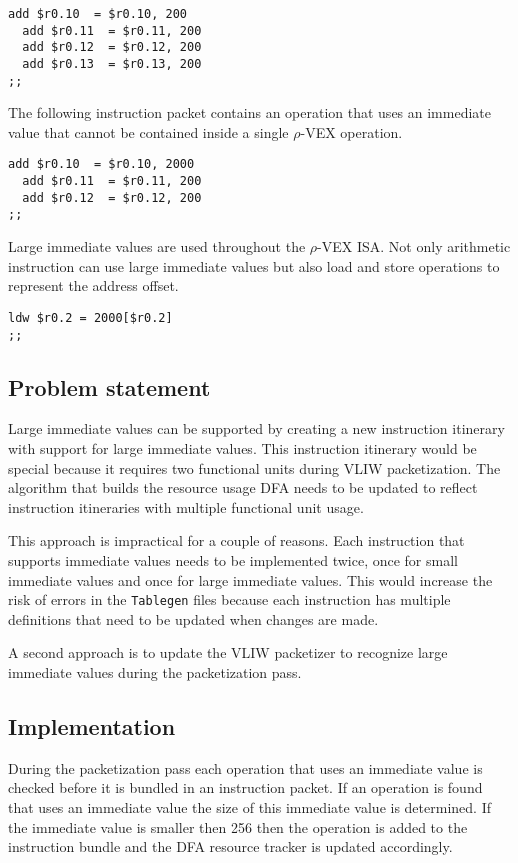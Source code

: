 \begin{lstlisting}[language=rvex]
  add $r0.10  = $r0.10, 200
  add $r0.11  = $r0.11, 200
  add $r0.12  = $r0.12, 200
  add $r0.13  = $r0.13, 200
;;
\end{lstlisting}

The following instruction packet contains an operation that uses an immediate value that cannot be contained inside a single $\rho$-VEX operation.

\begin{lstlisting}[language=rvex]
  add $r0.10  = $r0.10, 2000
  add $r0.11  = $r0.11, 200
  add $r0.12  = $r0.12, 200
;;
\end{lstlisting}

Large immediate values are used throughout the $\rho$-VEX ISA. Not only arithmetic instruction can use large immediate values but also load and store operations to represent the address offset.

\begin{lstlisting}[language=rvex]
  ldw $r0.2 = 2000[$r0.2]
;;
\end{lstlisting}

\subsection{Problem statement} %
\label{sub:problem_statement}
Large immediate values can be supported by creating a new instruction itinerary with support for large immediate values. This instruction itinerary would be special because it requires two functional units during VLIW packetization. The algorithm that builds the resource usage DFA needs to be updated to reflect instruction itineraries with multiple functional unit usage.

This approach is impractical for a couple of reasons. Each instruction that supports immediate values needs to be implemented twice, once for small immediate values and once for large immediate values. This would increase the risk of errors in the \texttt{Tablegen} files because each instruction has multiple definitions that need to be updated when changes are made.

A second approach is to update the VLIW packetizer to recognize large immediate values during the packetization pass.


\subsection{Implementation} %
\label{sub:implementation}
During the packetization pass each operation that uses an immediate value is checked before it is bundled in an instruction packet. If an operation is found that uses an immediate value the size of this immediate value is determined. If the immediate value is smaller then 256 then the operation is added to the instruction bundle and the DFA resource tracker is updated accordingly. 

